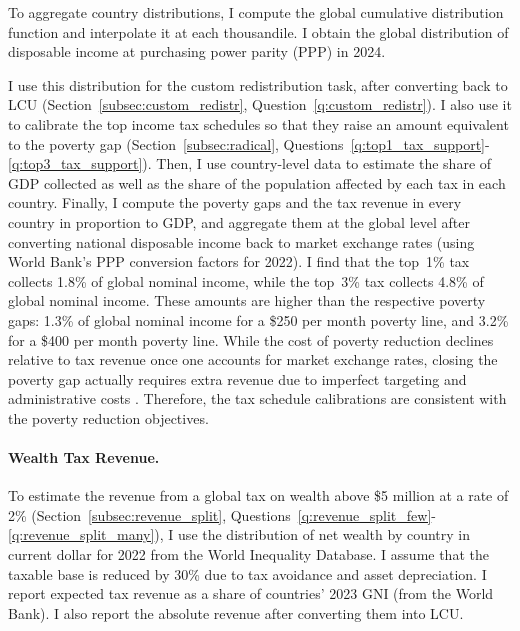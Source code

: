 To aggregate country distributions, I compute the global cumulative distribution function and interpolate it at each thousandile. I obtain the global distribution of disposable income at purchasing power parity (PPP) in 2024. 

I use this distribution for the custom redistribution task, after converting back to LCU (Section~\ref{subsec:custom_redistr}, Question~\ref{q:custom_redistr}). I also use it to calibrate the top income tax schedules so that they raise an amount equivalent to the poverty gap (Section~\ref{subsec:radical}, Questions~\ref{q:top1_tax_support}-\ref{q:top3_tax_support}). %
Then, I use country-level data to estimate the share of GDP collected as well as the share of the population affected by each tax in each country. 
Finally, I compute the poverty gaps and the tax revenue in every country in proportion to GDP, and aggregate them at the global level after converting national disposable income back to market exchange rates (using World Bank's PPP conversion factors for 2022). 
I find that the top~1\% tax collects 1.8\% of global nominal income, while the top~3\% tax collects 4.8\% of global nominal income. These amounts are higher than the respective poverty gaps: 1.3\% of global nominal income for a \$250 per month poverty line, and 3.2\% for a \$400 per month poverty line. 
While the cost of poverty reduction declines relative to tax revenue once one accounts  for market exchange rates, closing the poverty gap actually requires extra revenue due to imperfect targeting and administrative costs \citep{sahoo_what_2025}. Therefore, the tax schedule calibrations are consistent with the poverty reduction objectives.

\paragraph{Wealth Tax Revenue.}

To estimate the revenue from a global tax on wealth above \$5 million at a rate of 2\% (Section~\ref{subsec:revenue_split}, Questions~\ref{q:revenue_split_few}-\ref{q:revenue_split_many}), I use the distribution of net wealth by country in current dollar for 2022 from the World Inequality Database. I assume that the taxable base is reduced by 30\% due to tax avoidance and asset depreciation. I report expected tax revenue as a share of countries' 2023 GNI (from the World Bank). I also report the absolute revenue after converting them into LCU. 

